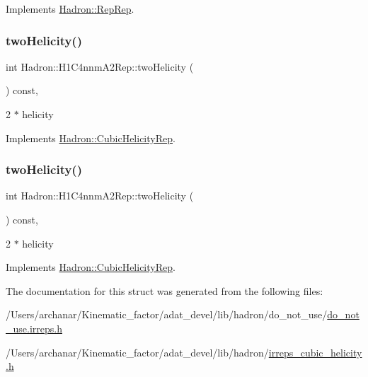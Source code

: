 Implements \mbox{\hyperlink{structHadron_1_1RepRep_ab3213025f6de249f7095892109575fde}{Hadron\+::\+Rep\+Rep}}.

\mbox{\label{structHadron_1_1H1C4nnmA2Rep_ade831b200fa8211a8f09dd6e7e80692a}} 
\subsubsection{\texorpdfstring{twoHelicity()}{twoHelicity()}\hspace{0.1cm}{\footnotesize\ttfamily [1/2]}}
{\footnotesize\ttfamily int Hadron\+::\+H1\+C4nnm\+A2\+Rep\+::two\+Helicity (\begin{DoxyParamCaption}{ }\end{DoxyParamCaption}) const\hspace{0.3cm}{\ttfamily [inline]}, {\ttfamily [virtual]}}

2 $\ast$ helicity 

Implements \mbox{\hyperlink{structHadron_1_1CubicHelicityRep_af507aa56fc2747eacc8cb6c96db31ecc}{Hadron\+::\+Cubic\+Helicity\+Rep}}.

\mbox{\label{structHadron_1_1H1C4nnmA2Rep_ade831b200fa8211a8f09dd6e7e80692a}} 
\subsubsection{\texorpdfstring{twoHelicity()}{twoHelicity()}\hspace{0.1cm}{\footnotesize\ttfamily [2/2]}}
{\footnotesize\ttfamily int Hadron\+::\+H1\+C4nnm\+A2\+Rep\+::two\+Helicity (\begin{DoxyParamCaption}{ }\end{DoxyParamCaption}) const\hspace{0.3cm}{\ttfamily [inline]}, {\ttfamily [virtual]}}

2 $\ast$ helicity 

Implements \mbox{\hyperlink{structHadron_1_1CubicHelicityRep_af507aa56fc2747eacc8cb6c96db31ecc}{Hadron\+::\+Cubic\+Helicity\+Rep}}.



The documentation for this struct was generated from the following files\+:\begin{DoxyCompactItemize}
\item 
/\+Users/archanar/\+Kinematic\+\_\+factor/adat\+\_\+devel/lib/hadron/do\+\_\+not\+\_\+use/\mbox{\hyperlink{do__not__use_8irreps_8h}{do\+\_\+not\+\_\+use.\+irreps.\+h}}\item 
/\+Users/archanar/\+Kinematic\+\_\+factor/adat\+\_\+devel/lib/hadron/\mbox{\hyperlink{lib_2hadron_2irreps__cubic__helicity_8h}{irreps\+\_\+cubic\+\_\+helicity.\+h}}\end{DoxyCompactItemize}
